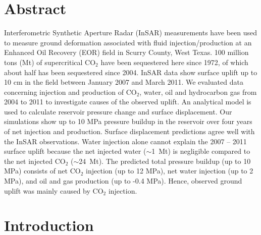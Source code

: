 % 
% 

\section{Abstract} 
Interferometric Synthetic Aperture Radar (InSAR) measurements have been used to measure ground deformation associated with fluid injection/production at an Enhanced Oil Recovery (EOR) field in Scurry County, West Texas. 100 million tons (Mt) of supercritical CO$_{2}$ have been sequestered here since 1972, of which about half has been sequestered since 2004.  InSAR data show surface uplift up to 10 cm in the field between January 2007 and March 2011.  We evaluated data concerning injection and production of CO$_{2}$, water, oil and hydrocarbon gas from 2004 to 2011 to investigate causes of the observed uplift.  An analytical model is used to calculate reservoir pressure change and surface displacement.  Our simulations show up to 10 MPa pressure buildup in the reservoir over four years of net injection and production.  Surface displacement predictions agree well with the InSAR observations.  Water injection alone cannot explain the 2007 – 2011 surface uplift because the net injected water ($\sim$1~Mt) is negligible compared to the net injected CO$_{2}$ ($\sim$24~Mt).  The predicted total pressure buildup (up to 10 MPa) consists of net CO$_{2}$ injection (up to 12 MPa), net water injection (up to 2 MPa), and oil and gas production (up to -0.4 MPa).  Hence, observed ground uplift was mainly caused by CO$_{2}$ injection.


\section{Introduction}

